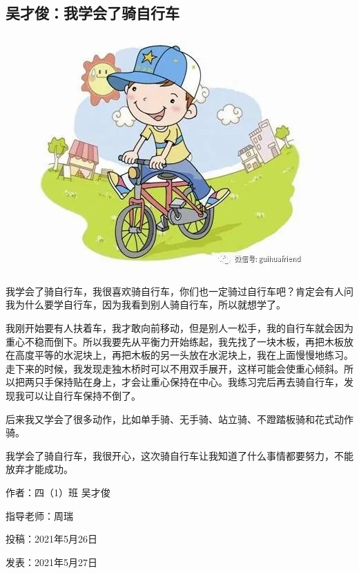 \vspace{10pt}

{\centering\subsection*{吴才俊：我学会了骑自行车}}


\renewcommand{\leftmark}{吴才俊：我学会了骑自行车}

\begin{figure}[htbp]

\centering

\includegraphics[width = .5\textwidth]{./ch/15.jpg}

\end{figure}



我学会了骑自行车，我很喜欢骑自行车，你们也一定骑过自行车吧？肯定会有人问我为什么要学自行车，因为我看到别人骑自行车，所以就想学了。

我刚开始要有人扶着车，我才敢向前移动，但是别人一松手，我的自行车就会因为重心不稳而倒下。所以我要先从平衡力开始练起，我先找了一块木板，再把木板放在高度平等的水泥块上，再把木板的另一头放在水泥块上，我在上面慢慢地练习。走下来的时候，我发现走独木桥时可以不用双手展开，这样可能会使重心倾斜。所以把两只手保持贴在身上，才会让重心保持在中心。我练习完后再去骑自行车，发现我可以让自行车保持不倒了。

后来我又学会了很多动作，比如单手骑、无手骑、站立骑、不蹬踏板骑和花式动作骑。

我学会了骑自行车，我很开心，这次骑自行车让我知道了什么事情都要努力，不能放弃才能成功。





\vspace{10pt}



作者：四（1）班 吴才俊



指导老师：周瑞



投稿：2021年5月26日



发表：2021年5月27日






                



\vspace{10pt}

\hline



